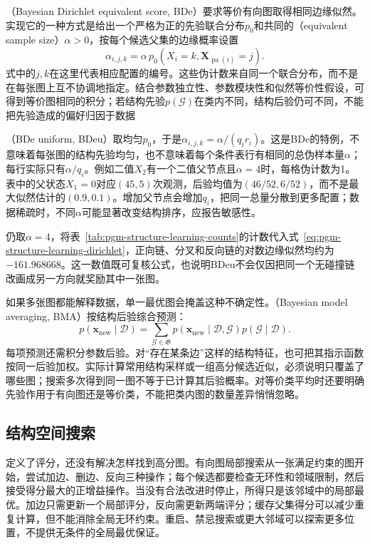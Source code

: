 （Bayesian Dirichlet equivalent score, BDe）要求等价有向图取得相同边缘似然。实现它的一种方式是给出一个严格为正的先验联合分布$p_0$和共同的（equivalent sample size）$\alpha>0$，按每个候选父集的边缘概率设置
\[
  \alpha_{i,j,k}
  =\alpha\,p_0(X_i=k,\bm{X}_{\operatorname{pa}(i)}=j).
\]
式中的$j,k$在这里代表相应配置的编号。这些伪计数来自同一个联合分布，而不是在每张图上互不协调地指定。结合参数独立性、参数模块性和似然等价性假设，可得到等价图相同的积分；若结构先验$p(\mathcal{G})$在类内不同，结构后验仍可不同，不能把先验造成的偏好归因于数据

（BDe uniform, BDeu）取均匀$p_0$，于是$\alpha_{i,j,k}=\alpha/(q_i r_i)$。这是BDe的特例，不意味着每张图的结构先验均匀，也不意味着每个条件表行有相同的总伪样本量$\alpha$；每行实际只有$\alpha/q_i$。例如二值$X_2$有一个二值父节点且$\alpha=4$时，每格伪计数为1。表中的父状态$X_1=0$对应$(45,5)$次观测，后验均值为$(46/52,6/52)$，而不是最大似然估计的$(0.9,0.1)$。增加父节点会增加$q_i$，把同一总量分散到更多配置；数据稀疏时，不同$\alpha$可能显著改变结构排序，应报告敏感性。

仍取$\alpha=4$，将表~\ref{tab:pgm-structure-learning-counts}的计数代入式~\eqref{eq:pgm-structure-learning-dirichlet}，正向链、分叉和反向链的对数边缘似然均约为$-161.968668$。这一数值既可复核公式，也说明BDeu不会仅因把同一个无碰撞链改画成另一方向就奖励其中一张图。

如果多张图都能解释数据，单一最优图会掩盖这种不确定性。（Bayesian model averaging, BMA）按结构后验综合预测：
\[
  p(\bm{x}_{\mathrm{new}}\mid\mathcal{D})
  =\sum_{\mathcal{G}\in\mathfrak{G}}
    p(\bm{x}_{\mathrm{new}}\mid\mathcal{D},\mathcal{G})
    p(\mathcal{G}\mid\mathcal{D}).
\]
每项预测还需积分参数后验。对“存在某条边”这样的结构特征，也可把其指示函数按同一后验加权。实际计算常用结构采样或一组高分候选近似，必须说明只覆盖了哪些图；搜索多次得到同一图不等于已计算其后验概率。对等价类平均时还要明确先验作用于有向图还是等价类，不能把类内图的数量差异悄悄忽略。

\subsection{结构空间搜索}
\label{sec:pgm-structure-learning-search}

定义了评分，还没有解决怎样找到高分图。有向图局部搜索从一张满足约束的图开始，尝试加边、删边、反向三种操作；每个候选都要检查无环性和领域限制，然后接受得分最大的正增益操作。当没有合法改进时停止，所得只是该邻域中的局部最优。加边只需更新一个局部评分，反向需更新两端评分；缓存父集得分可以减少重复计算，但不能消除全局无环约束。重启、禁忌搜索或更大邻域可以探索更多位置，不提供无条件的全局最优保证。

